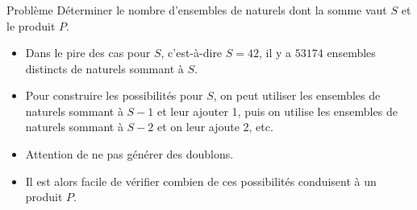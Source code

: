 \begin{frame}
    \frametitle{\problemtitle}
    \begin{block}{Problème}
        Déterminer le nombre d'ensembles de naturels dont la somme vaut $S$ et le produit $P$.
    \end{block}
    \pause
    \begin{itemize}[<+->]
        \item Dans le pire des cas pour $S$, c'est-à-dire $S=42$, il y a $53174$ ensembles distincts de naturels sommant à $S$.
        \item<+-> Pour construire les possibilités pour $S$, on peut utiliser les ensembles de naturels sommant à $S-1$ et leur ajouter 1, puis on utilise les ensembles de naturels sommant à $S-2$ et on leur ajoute 2, etc.
        \item Attention de ne pas générer des doublons.
        \item Il est alors facile de vérifier combien de ces possibilités conduisent à un produit $P$.
    \end{itemize}

\end{frame}